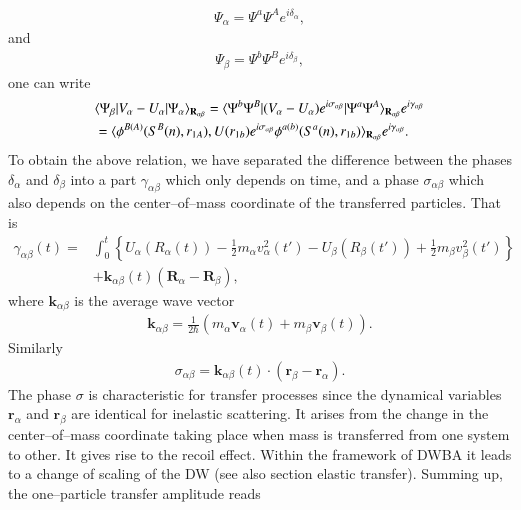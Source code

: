 \begin{subappendices}
   \begin{align}\label{eq1.D.31}
\Psi_\alpha=\Psi^a\Psi^Ae^{i\delta_\alpha},
   \end{align}
 and
    \begin{align}\label{eq1.D.32}
 \Psi_\beta=\Psi^b\Psi^Be^{i\delta_\beta},
    \end{align}
 one can write
    \begin{align}\label{eq1.D.33}
\nonumber &\langle {\Psi_\beta|V_\alpha-U_\alpha|\Psi_\alpha} \rangle_{\mathbf R_{\alpha\beta}}=\langle {\Psi^b\Psi^B|(V_\alpha-U_\alpha)e^{i\sigma_{\alpha\beta}}|\Psi^a\Psi^A} \rangle_{\mathbf R_{\alpha\beta}}e^{i\gamma_{\alpha\beta}}\\
&=\langle {\phi^{B(A)}(S^B(n),r_{1A}),U(r_{1b})e^{i\sigma_{\alpha\beta}}\phi^{a(b)}(S^a(n),r_{1b})} \rangle_{\mathbf R_{\alpha\beta}}e^{i\gamma_{\alpha\beta}}.
    \end{align}
 To obtain the above relation, we have separated the difference between the phases $\delta_\alpha$ and $\delta_\beta$ into a part $\gamma_{\alpha\beta}$ which only depends on time, and a phase $\sigma_{\alpha\beta}$ which also depends on the center--of--mass coordinate of the transferred particles. That is
\begin{align}\label{eq1.D.34}
\nonumber \gamma_{\alpha\beta}(t)=&\int_0^t\left\{U_\alpha( R_\alpha(t))-\frac{1}{2}m_\alpha v_\alpha^2(t')-U_\beta(R_\beta (t'))+\frac{1}{2}m_\beta v_\beta^2(t')\right\}\\
&+\mathbf k_{\alpha\beta}(t)(\mathbf R_\alpha-\mathbf R_\beta),
\end{align}
 where $\mathbf k_{\alpha\beta}$ is the average wave vector 
     \begin{align}\label{eq1.D.35}
\mathbf k_{\alpha\beta}=\frac{1}{2\hbar}\left(m_\alpha\mathbf v_\alpha(t)+m_\beta\mathbf v_\beta(t)\right).
     \end{align}
 Similarly
\begin{align}\label{eq1.D.36}
\sigma_{\alpha\beta}=\mathbf k_{\alpha\beta}(t)\cdot(\mathbf r_\beta-\mathbf r_\alpha).
\end{align} 
 The phase $\sigma$ is characteristic for transfer processes since the dynamical variables $\mathbf r_\alpha$ and $\mathbf r_\beta$ are identical for inelastic scattering. It arises from the change in the center--of--mass coordinate taking place when mass is transferred from one system to other. It gives rise to the recoil effect. Within the framework of DWBA it leads to a change of scaling of the DW (see also section elastic transfer). Summing up, the one--particle transfer amplitude reads

\end{subappendices}
